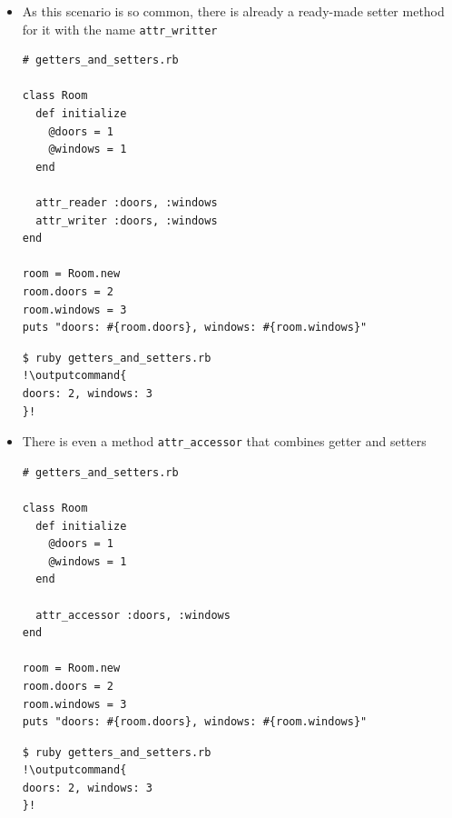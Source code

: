 \documentclass{beamer}
\newcommand{\outputcommand}[1]{\color{darkgreen}{#1}}
\begin{document}
\begin{frame}
\begin{itemize}
\begin{lstlisting}[escapechar=&]
  attr_reader :doors, :windows

  def doors= value
    @doors = value
  end

  def windows= value
    @windows = value
  end
end

room = Room.new
room.doors = 2
room.windows = 3
puts "doors: #{room.doors}, windows: #{room.windows}"
\end{lstlisting}

\lstset{language=shell}
\begin{lstlisting}[numbers=none, escapechar=!]
$ ruby getters_and_setters.rb
!\outputcommand{
doors: 2, windows: 3
}!
\end{lstlisting}

\item As this scenario is so common, there is already a ready-made setter method for it with the name \texttt{attr\_writter}
\lstset{language=Ruby, style=eclipse}
\begin{lstlisting}[escapechar=&]
# getters_and_setters.rb

class Room
  def initialize
    @doors = 1
    @windows = 1
  end

  attr_reader :doors, :windows
  attr_writer :doors, :windows
end

room = Room.new
room.doors = 2
room.windows = 3
puts "doors: #{room.doors}, windows: #{room.windows}"
\end{lstlisting}

\lstset{language=shell}
\begin{lstlisting}[numbers=none, escapechar=!]
$ ruby getters_and_setters.rb
!\outputcommand{
doors: 2, windows: 3
}!
\end{lstlisting}
\item There is even a method \texttt{attr\_accessor} that combines getter and setters
\lstset{language=Ruby, style=eclipse}
\begin{lstlisting}[escapechar=&]
# getters_and_setters.rb

class Room
  def initialize
    @doors = 1
    @windows = 1
  end

  attr_accessor :doors, :windows
end

room = Room.new
room.doors = 2
room.windows = 3
puts "doors: #{room.doors}, windows: #{room.windows}"
\end{lstlisting}

\lstset{language=shell}
\begin{lstlisting}[numbers=none, escapechar=!]
$ ruby getters_and_setters.rb
!\outputcommand{
doors: 2, windows: 3
}!
\end{lstlisting}


\end{itemize}

\end{frame}
\end{document}
